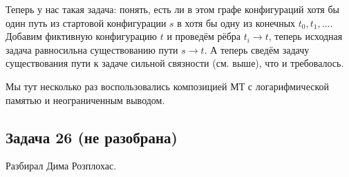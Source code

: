 		Теперь у нас такая задача: понять, есть ли в этом графе конфигураций хотя бы один
		путь из стартовой конфигурации $s$ в хотя бы одну из конечных $t_0, t_1, \dots$.
		Добавим фиктивную конфигурацию $t$ и проведём рёбра $t_i \to t$, теперь исходная
		задача равносильна существованию пути $s \to t$.
		А теперь сведём задачу существования пути к задаче сильной связности (см. выше),
		что и требовалось.

		\begin{Rem}
			Мы тут несколько раз воспользовались композицией МТ с логарифмической памятью
			и неограниченным выводом.
		\end{Rem}

\subsection{Задача 26 (не разобрана)}
	Разбирал Дима Розплохас.

